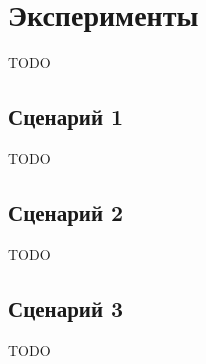\chapter{Эксперименты}

TODO

\section{Сценарий 1}

TODO

\section{Сценарий 2}

TODO

\section{Сценарий 3}

TODO

\newpage
